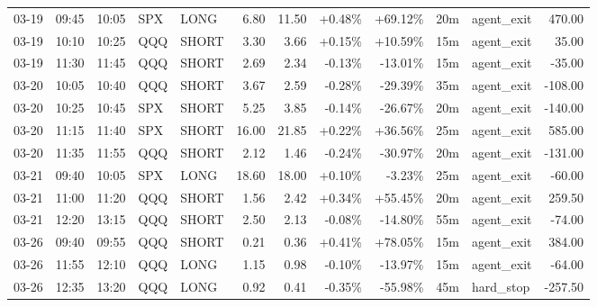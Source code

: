 \documentclass[11pt,a4paper]{article}
\begin{document}
\begin{center}
\begin{longtable}{>{\color{txtmain}}l l l l l r r r r r >{\color{txtmain}}l r}
03-19 & 09:45 & 10:05 & SPX & LONG & 6.80 & 11.50 & \textcolor{wingreen}{+0.48\%} & \textcolor{wingreen}{+69.12\%} & 20m & agent\_exit & \textcolor{wingreen}{470.00} \\
03-19 & 10:10 & 10:25 & QQQ & SHORT & 3.30 & 3.66 & \textcolor{wingreen}{+0.15\%} & \textcolor{wingreen}{+10.59\%} & 15m & agent\_exit & \textcolor{wingreen}{35.00} \\
03-19 & 11:30 & 11:45 & QQQ & SHORT & 2.69 & 2.34 & \textcolor{lossred}{-0.13\%} & \textcolor{lossred}{-13.01\%} & 15m & agent\_exit & \textcolor{lossred}{-35.00} \\
03-20 & 10:05 & 10:40 & QQQ & SHORT & 3.67 & 2.59 & \textcolor{lossred}{-0.28\%} & \textcolor{lossred}{-29.39\%} & 35m & agent\_exit & \textcolor{lossred}{-108.00} \\
03-20 & 10:25 & 10:45 & SPX & SHORT & 5.25 & 3.85 & \textcolor{lossred}{-0.14\%} & \textcolor{lossred}{-26.67\%} & 20m & agent\_exit & \textcolor{lossred}{-140.00} \\
03-20 & 11:15 & 11:40 & SPX & SHORT & 16.00 & 21.85 & \textcolor{wingreen}{+0.22\%} & \textcolor{wingreen}{+36.56\%} & 25m & agent\_exit & \textcolor{wingreen}{585.00} \\
03-20 & 11:35 & 11:55 & QQQ & SHORT & 2.12 & 1.46 & \textcolor{lossred}{-0.24\%} & \textcolor{lossred}{-30.97\%} & 20m & agent\_exit & \textcolor{lossred}{-131.00} \\
03-21 & 09:40 & 10:05 & SPX & LONG & 18.60 & 18.00 & \textcolor{wingreen}{+0.10\%} & \textcolor{lossred}{-3.23\%} & 25m & agent\_exit & \textcolor{lossred}{-60.00} \\
03-21 & 11:00 & 11:20 & QQQ & SHORT & 1.56 & 2.42 & \textcolor{wingreen}{+0.34\%} & \textcolor{wingreen}{+55.45\%} & 20m & agent\_exit & \textcolor{wingreen}{259.50} \\
03-21 & 12:20 & 13:15 & QQQ & SHORT & 2.50 & 2.13 & \textcolor{lossred}{-0.08\%} & \textcolor{lossred}{-14.80\%} & 55m & agent\_exit & \textcolor{lossred}{-74.00} \\
03-26 & 09:40 & 09:55 & QQQ & SHORT & 0.21 & 0.36 & \textcolor{wingreen}{+0.41\%} & \textcolor{wingreen}{+78.05\%} & 15m & agent\_exit & \textcolor{wingreen}{384.00} \\
03-26 & 11:55 & 12:10 & QQQ & LONG & 1.15 & 0.98 & \textcolor{lossred}{-0.10\%} & \textcolor{lossred}{-13.97\%} & 15m & agent\_exit & \textcolor{lossred}{-64.00} \\
03-26 & 12:35 & 13:20 & QQQ & LONG & 0.92 & 0.41 & \textcolor{lossred}{-0.35\%} & \textcolor{lossred}{-55.98\%} & 45m & hard\_stop & \textcolor{lossred}{-257.50} \\

\end{longtable}
\end{center}
\end{document}
